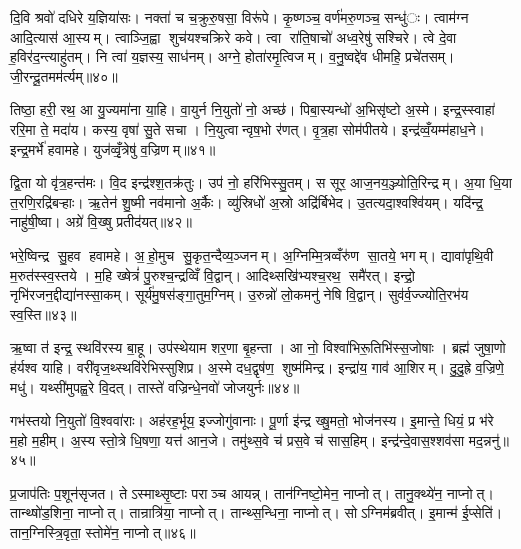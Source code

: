 दि॒वि श्रवो॑ दधिरे य॒ज्ञिया॑सः। नक्ता॑ च च॒क्रुरु॒षसा॒ विरू॑पे। कृ॒ष्णञ्च॒ वर्ण॑मरु॒णञ्च॒ सन्धु॑ः। त्वाम॑ग्न आदि॒त्यास॑ आ॒स्यम्। त्वाञ्जि॒ह्वा शुच॑यश्चक्रिरे कवे। त्वा रा॑ति॒षाचो॑ अध्व॒रेषु॑ सश्चिरे। त्वे दे॒वा ह॒विर॑द॒न्त्याहु॑तम्। नि त्वा॑ य॒ज्ञस्य॒ साध॑नम्। अग्ने॒ होता॑रमृ॒त्विजम्। व॒नु॒ष्वद्दे॑व धीमहि॒ प्रचे॑तसम्। जी॒रन्दू॒तमम॑र्त्यम्॥४०॥


तिष्ठा॒ हरी॒ रथ॒ आ यु॒ज्यमा॑ना या॒हि। वा॒युर्न नि॒युतो॑ नो॒ अच्छ॑। पिबा॒स्यन्धो॑ अ॒भिसृ॑ष्टो अ॒स्मे। इन्द्र॒स्स्वाहा॑ ररि॒मा ते॒ मदा॑य। कस्य॒ वृषा॑ सु॒ते सचा। नि॒युत्वान्वृष॒भो र॑णत्। वृ॒त्र॒हा सोम॑पीतये। इन्द्र॑व्वँ॒यम्म॑हाध॒ने। इन्द्र॒मर्भे॑ हवामहे। युज॑व्वृँ॒त्रेषु॑ व॒ज्रिणम्॥४१॥

द्वि॒ता यो वृ॑त्र॒हन्त॑मः। वि॒द इन्द्र॑श्श॒तक्र॑तुः। उप॑ नो॒ हरि॑भिस्सु॒तम्। स सूर॒ आज॒नय॒ञ्ज्योति॒रिन्द्रम्। अ॒या धि॒या त॒रणि॒रद्रि॑बऱ्हाः। ऋ॒तेन॑ शु॒ष्मी नव॑मानो अ॒र्कैः। व्यु॑स्रिधो॑ अ॒स्रो अद्रि॑र्बिभेद। उ॒तत्यदा॒श्वश्वि॑यम्। यदि॑न्द्र॒ नाहु॑षी॒ष्वा। अग्रे॑ वि॒ख्षु प्रतीद॑यत्॥४२॥

भरे॒ष्विन्द्र सु॒हव हवामहे। अ॒हो॒मुच सु॒कृत॒न्दैव्य॒ञ्जनम्। अ॒ग्निम्मि॒त्रव्वँरु॑ण सा॒तये॒ भगम्। द्यावा॑पृथि॒वी म॒रुत॑स्स्व॒स्तये। म॒हि ख्षेत्रं॑ पु॒रुश्च॒न्द्रव्विँ वि॒द्वान्। आदिथ्सखि॑भ्यश्च॒रथ॒ समै॑रत्। इन्द्रो॒ नृभि॑रजन॒द्दीद्या॑नस्सा॒कम्। सूर्य॑मु॒षस॑ङ्गा॒तुम॒ग्निम्। उ॒रुन्नो॑ लो॒कमनु॑ नेषि वि॒द्वान्। सुव॑र्व॒ज्ज्योति॒रभ॑य स्व॒स्ति॥४३॥

ऋ॒ष्वा त॑ इन्द्र॒ स्थवि॑रस्य बा॒हू। उप॑स्थेयाम शर॒णा बृ॒हन्ता। आ नो॒ विश्वा॑भिरू॒तिभि॑स्स॒जोषाः। ब्रह्म॑ जुषा॒णो ह॑र्यश्व याहि। वरी॑वृज॒थ्स्थवि॑रेभिस्सुशिप्र। अ॒स्मे दध॒द्वृष॑ण॒ शुष्म॑मिन्द्र। इन्द्रा॑य॒ गाव॑ आ॒शिरम्। दु॒दु॒ह्रे व॒ज्रिणे॒ मधु॑। यथ्सी॑मुपह्व॒रे वि॒दत्। तास्ते॑ वज्रिन्धे॒नवो॑ जोजयुर्नः॥४४॥

गभ॑स्तयो नि॒युतो॑ वि॒श्ववा॑राः। अह॑रह॒र्भूय॒ इज्जोगु॑वानाः। पू॒र्णा इ॑न्द्र ख्षु॒मतो॒ भोज॑नस्य। इ॒मान्ते॒ धियं॒ प्र भ॑रे म॒हो म॒हीम्। अ॒स्य स्तो॒त्रे धि॒षणा॒ यत्त॑ आन॒जे। तमु॑थ्स॒वे च॑ प्रस॒वे च॑ सास॒हिम्। इन्द्र॑न्दे॒वास॒श्शव॑सा मद॒न्ननु॑॥४५॥


प्र॒जाप॑तिः प॒शून॑सृजत। तेऽस्माथ्सृ॒ष्टाः पराञ्च आयन्न्। तान॑ग्निष्टो॒मेन॒ नाप्नोत्। तानु॒क्थ्ये॑न॒ नाप्नोत्। तान्थ्षो॑ड॒शिना॒ नाप्नोत्। तान्रात्रि॑या॒ नाप्नोत्। तान्थ्स॒न्धिना॒ नाप्नोत्। सोऽग्निम॑ब्रवीत्। इ॒मान्म॑ ई॒प्सेति॑। तान॒ग्निस्त्रि॒वृता॒ स्तोमे॑न॒ नाप्नोत्॥४६॥

